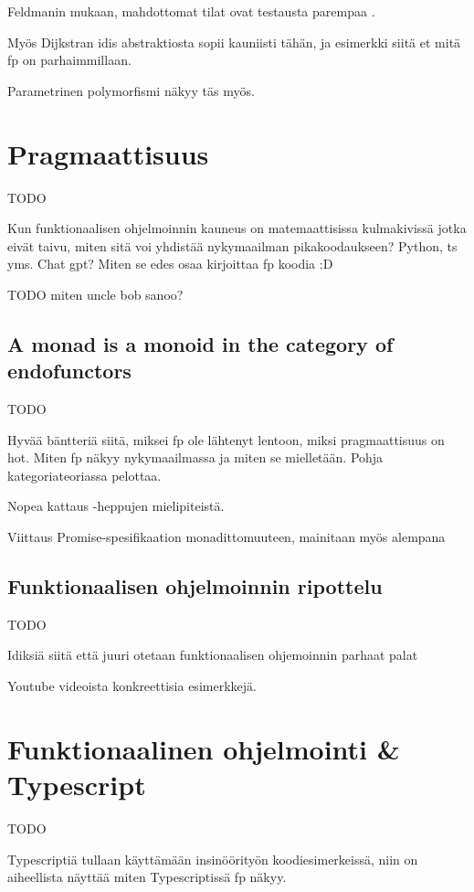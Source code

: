 Feldmanin mukaan, mahdottomat tilat ovat testausta parempaa \cite{impossiblebetter}.

Myös Dijkstran idis abstraktiosta sopii kauniisti tähän, ja esimerkki siitä et mitä \gls{fp} on parhaimmillaan.

Parametrinen polymorfismi näkyy täs myös.

\section{Pragmaattisuus}

TODO

Kun funktionaalisen ohjelmoinnin kauneus on matemaattisissa kulmakivissä jotka eivät taivu, miten sitä voi yhdistää nykymaailman pikakoodaukseen? Python, \gls{ts} yms. Chat gpt? Miten se edes osaa kirjoittaa fp koodia :D

TODO miten uncle bob sanoo? \cite{martin2017pragmaticfp}

\subsection{A monad is a monoid in the category of endofunctors}

TODO

Hyvää bäntteriä siitä, miksei fp ole lähtenyt lentoon, miksi pragmaattisuus on hot. Miten fp näkyy nykymaailmassa ja miten se mielletään. Pohja kategoriateoriassa pelottaa.

Nopea kattaus  -heppujen mielipiteistä.

Viittaus Promise-spesifikaation monadittomuuteen, mainitaan myös alempana

\subsection{Funktionaalisen ohjelmoinnin ripottelu}

TODO

Idiksiä siitä että juuri otetaan funktionaalisen ohjemoinnin parhaat palat

Youtube videoista konkreettisia esimerkkejä.

\section{Funktionaalinen ohjelmointi \& Typescript}


TODO

Typescriptiä tullaan käyttämään insinöörityön koodiesimerkeissä, niin on aiheellista näyttää miten Typescriptissä \gls{fp} näkyy.

